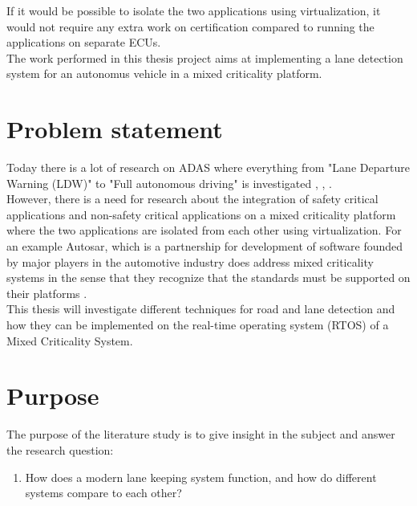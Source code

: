 If it would be possible to isolate the two applications using virtualization, it would not require any extra work on certification compared to running the applications on separate ECUs.\\

The work performed in this thesis project aims at implementing a lane detection system for an autonomus vehicle in a mixed criticality platform. 

\section{Problem statement}
Today there is a lot of research on ADAS where everything from "Lane Departure Warning (LDW)" to "Full autonomous driving" is investigated \cite{BarHillel2014}, \cite{Yenikaya:2013:KVR:2522968.2522970}, \cite{mccall2006video}.\\

However, there is a need for research about the integration of safety critical applications and non-safety critical applications on a mixed criticality platform where the two applications are isolated from each other using virtualization. For an example Autosar, which is a partnership for development of software founded by major players in the automotive industry does address mixed criticality systems in the sense that they recognize that the standards must be supported on their platforms \cite{burns2013mixed} \cite{auto}.\\

This thesis will investigate different techniques for road and lane detection and how they can be implemented on the real-time operating system (RTOS) of a Mixed Criticality System. 


\section{Purpose}
The purpose of the literature study is to give insight in the subject and answer the research question:
\begin{enumerate}  
\item How does a modern lane keeping system function, and how do different systems compare to each other? %
\end{enumerate}

